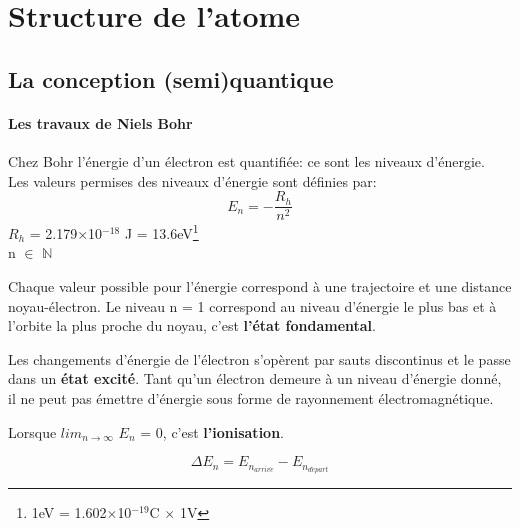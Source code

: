 \documentclass[10pt,a4paper]{book}
\begin{document}
\section{Structure de l'atome}
\subsection{La conception (semi)quantique}
\paragraph{Les travaux de Niels Bohr} Chez Bohr l'énergie d'un électron est quantifiée: ce sont les niveaux d'énergie. \\
Les valeurs permises des niveaux d'énergie sont définies par:
\begin{displaymath}
E_n = - \frac{R_h}{n^2}
\end{displaymath}
$R_h$ = 2.179$\times$10$^{-18}$ J = 13.6eV\footnote{1eV = 1.602$\times$10$^{-19}$C $\times$ 1V}\\
n $\in$ $\mathbb{N}$ \par
Chaque valeur possible pour l'énergie correspond à une trajectoire et une distance noyau-électron. Le niveau n = 1 correspond au niveau d'énergie le plus bas et à l'orbite la plus proche du noyau, c'est \textbf{l'état fondamental}.\par
Les changements d'énergie de l'électron s'opèrent par sauts discontinus et le passe dans un \textbf{état excité}. Tant qu’un électron demeure à un niveau d’énergie donné, il ne peut pas émettre d’énergie sous forme de rayonnement électromagnétique. \par
Lorsque $lim_{n \rightarrow \infty}$ $E_n$ = 0, c'est \textbf{l'ionisation}. \par
\begin{displaymath}
{\Delta}E_n = E_{n_{arriv\acute{e}}} - E_{n_{d\acute{e}part}}
\end{displaymath}
\end{document}
